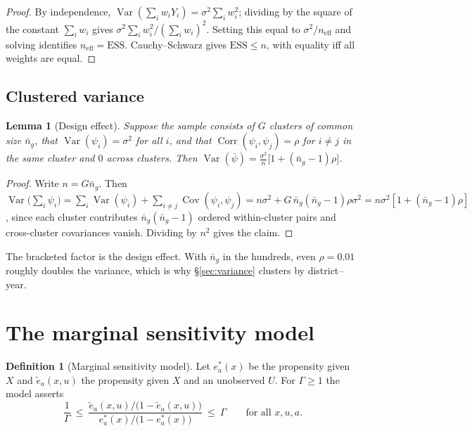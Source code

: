 \documentclass[11pt,a4paper]{article}
\theoremstyle{plain}
\newtheorem{lemma}[theorem]{Lemma}
\theoremstyle{definition}
\newtheorem{definition}[theorem]{Definition}
\theoremstyle{remark}
\DeclareMathOperator{\Var}{Var}
\DeclareMathOperator{\Cov}{Cov}
\DeclareMathOperator{\Corr}{Corr}
\begin{document}
\begin{proof}
By independence, $\Var(\sum_iw_iY_i)=\sigma^2\sum_iw_i^2$; dividing by the square of the
constant $\sum_iw_i$ gives $\sigma^2\sum_iw_i^2/(\sum_iw_i)^2$. Setting this equal to
$\sigma^2/n_{\text{eff}}$ and solving identifies $n_{\text{eff}}=\text{ESS}$. Cauchy--Schwarz
gives $\text{ESS}\le n$, with equality iff all weights are equal.
\end{proof}

\subsection{Clustered variance}

\begin{lemma}[Design effect]\label{lem:cluster}
Suppose the sample consists of $G$ clusters of common size $\bar n_g$, that
$\Var(\psi_i)=\sigma^2$ for all $i$, and that $\Corr(\psi_i,\psi_j)=\rho$ for $i\ne j$ in the
same cluster and $0$ across clusters. Then
$\Var(\bar\psi)=\frac{\sigma^2}{n}\bigl[1+(\bar n_g-1)\rho\bigr]$.
\end{lemma}

\begin{proof}
Write $n=G\bar n_g$. Then
$\Var\bigl(\sum_i\psi_i\bigr)=\sum_i\Var(\psi_i)+\sum_{i\ne j}\Cov(\psi_i,\psi_j)
=n\sigma^2+G\,\bar n_g(\bar n_g-1)\rho\sigma^2=n\sigma^2[1+(\bar n_g-1)\rho]$,
since each cluster contributes $\bar n_g(\bar n_g-1)$ ordered within-cluster pairs and
cross-cluster covariances vanish. Dividing by $n^2$ gives the claim.
\end{proof}

The bracketed factor is the design effect. With $\bar n_g$ in the hundreds, even $\rho=0.01$
roughly doubles the variance, which is why \S\ref{sec:variance} clusters by district--year.

\section{The marginal sensitivity model}\label{app:sens}

\begin{definition}[Marginal sensitivity model]\label{def:msm}
Let $e^\ast_a(x)$ be the propensity given $X$ and $\tilde e_a(x,u)$ the propensity given $X$ and
an unobserved $U$. For $\Gamma\ge1$ the model asserts
\[
\frac1\Gamma\ \le\
\frac{\tilde e_a(x,u)\big/\bigl(1-\tilde e_a(x,u)\bigr)}
     {e^\ast_a(x)\big/\bigl(1-e^\ast_a(x)\bigr)}
\ \le\ \Gamma
\qquad\text{for all }x,u,a.
\]
\end{definition}
\end{document}
